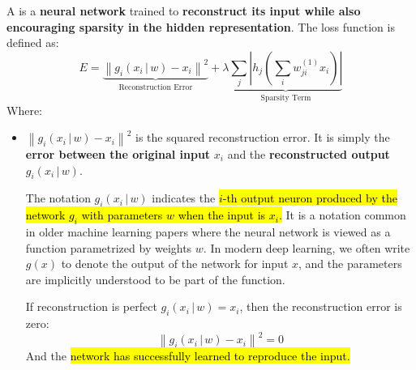 \highspace
\begin{definitionbox}[: Autoencoder]
    A  is a \textbf{neural network} trained to \textbf{reconstruct its input while also encouraging sparsity in the hidden representation}. The loss function is defined as:
    \begin{equation}
        E = \underbrace{\left\| g_{i}\left(x_{i} \, | \, w \right) - x_{i}\right\|^{2}}_{\text{Reconstruction Error}} + \lambda \underbrace{\sum_{j} \left| h_j \left(\sum_{i} w_{ji}^{(1)} x_{i}\right) \right|}_{\text{Sparsity Term}}
    \end{equation}
    Where:
    \begin{itemize}
        \item $\left\| g_{i}\left(x_{i} \, | \, w \right) - x_{i}\right\|^{2}$ is the squared reconstruction error. It is simply the \textbf{error between the original input} $x_i$ and the \textbf{reconstructed output} $g_{i}\left(x_i \, | \, w\right)$.
        
        \begin{deepeningbox}
            The notation $g_{i}\left(x_i \, | \, w\right)$ indicates the \hl{$i$-th output neuron produced by the network $g_i$ with parameters $w$ when the input is $x_i$.} It is a notation common in older machine learning papers where the neural network is viewed as a function parametrized by weights $w$. In modern deep learning, we often write $g(x)$ to denote the output of the network for input $x$, and the parameters are implicitly understood to be part of the function.
        \end{deepeningbox}

        If reconstruction is perfect $g_{i}\left(x_i \, | \, w\right) = x_i$, then the reconstruction error is zero:
        \begin{equation*}
            \left\| g_{i}\left(x_i \, | \, w\right) - x_i\right\|^{2} = 0
        \end{equation*}
        And the \hl{network has successfully learned to reproduce the input.}



\end{itemize}
\end{definitionbox}
